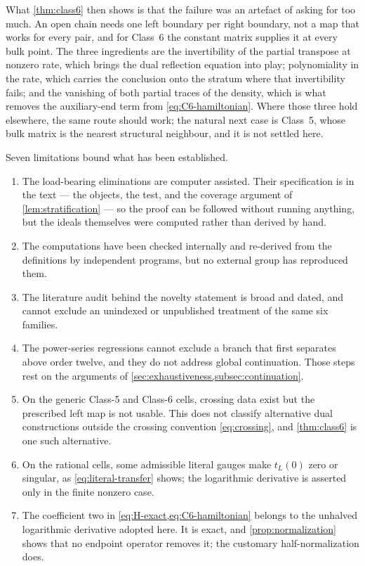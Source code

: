 \documentclass[11pt,reqno]{amsart}
\theoremstyle{plain}
\theoremstyle{definition}
\theoremstyle{remark}
\numberwithin{equation}{section}
\begin{document}
What \cref{thm:class6} then shows is that the failure was an artefact of asking
for too much. An open chain needs one left boundary per right boundary, not a map
that works for every pair, and for Class~6 the constant matrix supplies it at
every bulk point. The three ingredients are the invertibility of the partial
transpose at nonzero rate, which brings the dual reflection equation into play;
polynomiality in the rate, which carries the conclusion onto the stratum where
that invertibility fails; and the vanishing of both partial traces of the
density, which is what removes the auxiliary-end term from
\cref{eq:C6-hamiltonian}. Where those three hold elsewhere, the same route should
work; the natural next case is Class~5, whose bulk matrix is the nearest
structural neighbour, and it is not settled here.

Seven limitations bound what has been established.

\begin{enumerate}
\item The load-bearing eliminations are computer assisted. Their specification is
in the text --- the objects, the test, and the coverage argument of
\cref{lem:stratification} --- so the proof can be followed without running
anything, but the ideals themselves were computed rather than derived by hand.
\item The computations have been checked internally and re-derived from the
definitions by independent programs, but no external group has reproduced them.
\item The literature audit behind the novelty statement is broad and dated, and
cannot exclude an unindexed or unpublished treatment of the same six families.
\item The power-series regressions cannot exclude a branch that first separates
above order twelve, and they do not address global continuation. Those steps rest
on the arguments of \cref{sec:exhaustiveness,subsec:continuation}.
\item On the generic Class-5 and Class-6 cells, crossing data exist but the
prescribed left map is not usable. This does not classify alternative dual
constructions outside the crossing convention \cref{eq:crossing}, and
\cref{thm:class6} is one such alternative.
\item On the rational cells, some admissible literal gauges make $t_L(0)$ zero or
singular, as \cref{eq:literal-transfer} shows; the logarithmic derivative is
asserted only in the finite nonzero case.
\item The coefficient two in \cref{eq:H-exact,eq:C6-hamiltonian} belongs to the
unhalved logarithmic derivative adopted here. It is exact, and
\cref{prop:normalization} shows that no endpoint operator removes it; the
customary half-normalization does.
\end{enumerate}
\end{document}
